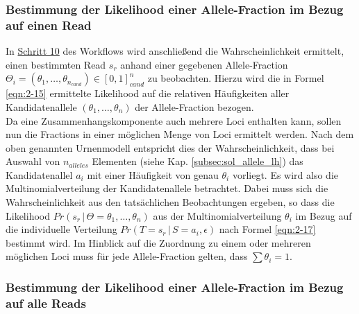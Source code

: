 \subsubsection{Bestimmung der Likelihood einer Allele-Fraction im Bezug auf einen Read} \label{sol_vaf_one_reads}

In \hyperref[step10]{Schritt 10\label{step10txt}} des Workflows wird anschließend die Wahrscheinlichkeit ermittelt, einen bestimmten Read $s_{r}$ anhand einer gegebenen Allele-Fraction $\Theta_{i} = (\theta_{1},\dots,\theta_{n_{cand}}) \in [0,1]^n_{cand}$ zu beobachten. Hierzu wird die in Formel \eqref{eqn:2-15} ermittelte Likelihood auf die relativen Häufigkeiten aller Kandidatenallele $ (\theta_{1},\dots,\theta_{n}) $ der Allele-Fraction bezogen.\\

Da eine Zusammenhangskomponente auch mehrere Loci enthalten kann, sollen nun die Fractions in einer möglichen Menge von Loci ermittelt werden. Nach dem oben genannten Urnenmodell entspricht dies der Wahrscheinlichkeit, dass bei Auswahl von $n_{alleles}$ Elementen (siehe Kap. \ref{subsec:sol_allele_lh}) das Kandidatenallel $ a_{i}$ mit einer Häufigkeit von genau $\theta_{i}$ vorliegt. Es wird also die Multinomialverteilung der Kandidatenallele betrachtet. Dabei muss sich die Wahrscheinlichkeit aus den tatsächlichen Beobachtungen ergeben, so dass die Likelihood $Pr(s_{r} \, | \, \Theta=\theta_{1},\dots,\theta_{n})$ aus der Multinomialverteilung $\theta_{i}$ im Bezug auf die individuelle Verteilung $Pr(T=s_{r} \, | \, S=a_{i}, \epsilon)$ nach Formel \eqref{eqn:2-17} bestimmt wird. Im Hinblick auf die Zuordnung zu einem oder mehreren möglichen Loci muss für jede Allele-Fraction gelten, dass $\sum \theta_{i} = 1$.
\vspace{-0.5cm}
\begin{center}
\end{center}
\subsubsection{Bestimmung der Likelihood einer Allele-Fraction im Bezug auf alle Reads} \label{sol_vaf_all_reads}

